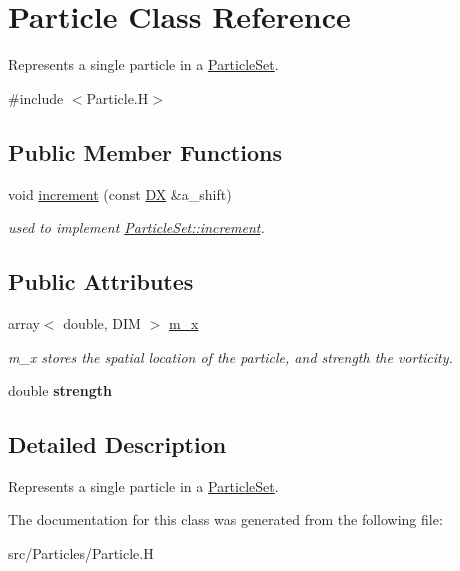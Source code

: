\hypertarget{class_particle}{}\section{Particle Class Reference}
\label{class_particle}


Represents a single particle in a \hyperlink{class_particle_set}{Particle\+Set}.  




{\ttfamily \#include $<$Particle.\+H$>$}

\subsection*{Public Member Functions}
\begin{DoxyCompactItemize}
\item 
\mbox{\label{class_particle_a6f0bab4db5e06324b46ea10927059306}} 
void \hyperlink{class_particle_a6f0bab4db5e06324b46ea10927059306}{increment} (const \hyperlink{class_d_x}{DX} \&a\+\_\+shift)
\begin{DoxyCompactList}\small\item\em used to implement \hyperlink{class_particle_set_aa27ac22706a979dd57b6523254b27d83}{Particle\+Set\+::increment}. \end{DoxyCompactList}\end{DoxyCompactItemize}
\subsection*{Public Attributes}
\begin{DoxyCompactItemize}
\item 
\mbox{\label{class_particle_a70fbd1aa4ee14710ab1e2f2cf5bdc211}} 
array$<$ double, D\+IM $>$ \hyperlink{class_particle_a70fbd1aa4ee14710ab1e2f2cf5bdc211}{m\+\_\+x}
\begin{DoxyCompactList}\small\item\em m\+\_\+x stores the spatial location of the particle, and strength the vorticity. \end{DoxyCompactList}\item 
\mbox{\label{class_particle_a8de58af6e42f14ba1ffefc2007498bbf}} 
double {\bfseries strength}
\end{DoxyCompactItemize}


\subsection{Detailed Description}
Represents a single particle in a \hyperlink{class_particle_set}{Particle\+Set}. 

The documentation for this class was generated from the following file\+:\begin{DoxyCompactItemize}
\item 
src/\+Particles/Particle.\+H\end{DoxyCompactItemize}
